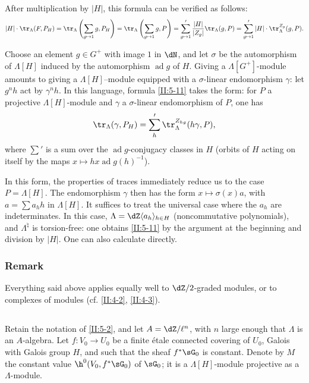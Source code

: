 After multiplication by $|H|$, this formula can be verified as follows:
\[
  |H|\cdot \tr_\Lambda(F,P_H)
    = \tr_\Lambda\left(\sum_{g\mapsto 1} g,P_H\right) 
    = \tr_\Lambda\left(\sum_{g\mapsto 1} g,P\right)
    = \sum_{g\mapsto 1}' \frac{|H|}{|Z_g|}\tr_\Lambda(g,P)
    = \sum_{g\mapsto 1}' |H|\cdot \tr_\Lambda^{Z_g}(g,P) \text{.}
\]

Choose an element $g\in G^+$ with image $1$ in $\dN$, and let $\sigma$ be
the automorphism of $\Lambda[H]$ induced by the automorphism
$\operatorname{ad} g$ of $H$. Giving a $\Lambda[G^+]$-module amounts to
giving a $\Lambda[H]$--module equipped with a $\sigma$-linear endomorphism
$\gamma$: let $g^n h$ act by $\gamma^n h$. In this language, formula
\ref{II:5-11} takes the form: for $P$ a projective $\Lambda[H]$-module and
$\gamma$ a $\sigma$-linear endomorphism of $P$, one has
\[
  \tr_\Lambda(\gamma,P_H) = \sum_h' \tr_\Lambda^{Z_{hg}}(h\gamma,P)\text{,}
\]
where $\sum'$ is a sum over the $\operatorname{ad}g$-conjugacy classes in
$H$ (orbits of $H$ acting on itself by the maps
$x\mapsto h x \operatorname{ad} g(h)^{-1}$).

In this form, the properties of traces immediately reduce us to the case
$P=\Lambda[H]$. The endomorphism $\gamma$ then has the form
$x\mapsto \sigma(x) a$, with $a=\sum a_h h$ in $\Lambda[H]$. It suffices to
treat the universal case where the $a_h$ are indeterminates. In this case,
$\Lambda=\dZ\langle a_h\rangle_{h\in H}$ (noncommutative polynomials), and
$\Lambda^\natural$ is torsion-free: one obtains \ref{II:5-11} by the
argument at the beginning and division by $|H|$. One can also calculate
directly.






\subsubsection{Remark}\label{II:5-11-1}

Everything said above applies equally well to $\dZ/2$-graded modules, or to
complexes of modules (cf. \ref{II:4-2}, \ref{II:4-3}).






\subsection{}\label{II:5-12}

Retain the notation of \ref{II:5-2}, and let $A=\dZ/\ell^n$, with $n$ large
enough that $\Lambda$ is an $A$-algebra. Let $f:V_0\to U_0$ be a finite
\'etale connected covering of $U_0$, Galois with Galois group $H$, and such
that the sheaf $f^*\sG_0$ is constant. Denote by $M$ the constant value $\h^0(V_0,f^*\sG_0)$ of $\sG_0$; it is a $\Lambda[H]$-module projective as a
$\Lambda$-module.

